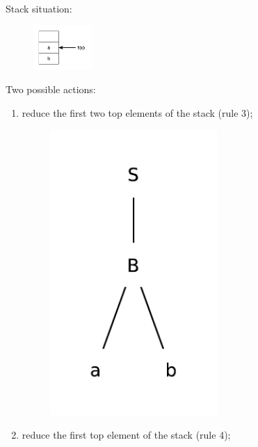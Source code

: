 Stack situation:
\begin{figure}[H]
    \centerline{\includegraphics[width=0.2\textwidth]{img/24.pdf}}
\end{figure}
Two possible actions:
\begin{enumerate}
    \item
    reduce the first two top elements of the stack (rule 3);
    \begin{figure}[H]
        \centerline{\includegraphics[width=0.6\textwidth]{img/25.pdf}}
    \end{figure}
    \item
    reduce the first top element of the stack (rule 4);
    \begin{figure}[H]

\end{figure}
\end{enumerate}
